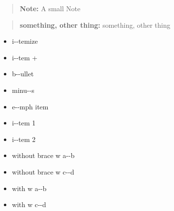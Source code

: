 \documentclass{book}
\begin{document}
\begin{quote}
\begin{footnotesize}
\textbf{Note:} A small Note
\end{footnotesize}
\end{quote}

\begin{quote}
\begin{footnotesize}
\textbf{something, other thing:} something, other thing
\end{footnotesize}
\end{quote}

\begin{itemize}
\item i{-}{-}temize
\end{itemize}

\begin{itemize}[label=+]
\item i{-}{-}tem +
\end{itemize}

\begin{itemize}[label=\textbullet{}]
\item b{-}{-}ullet
\end{itemize}

\begin{itemize}[label=-]
\item minu{-}{-}s
\end{itemize}

\begin{itemize}[label=\emph{after emph}]
\item e{-}{-}mph item
\end{itemize}

\begin{itemize}[label=\textbullet{} a{-}{-}n itemize line]
\item {}%
i{-}{-}tem 1
\item i{-}{-}tem 2
\end{itemize}

\begin{itemize}[label={}]
\item without brace w a{-}{-}b
\item without brace w c{-}{-}d
\end{itemize}

\begin{itemize}[label={}]
\item with w a{-}{-}b
\item with w c{-}{-}d
\end{itemize}
\end{document}
